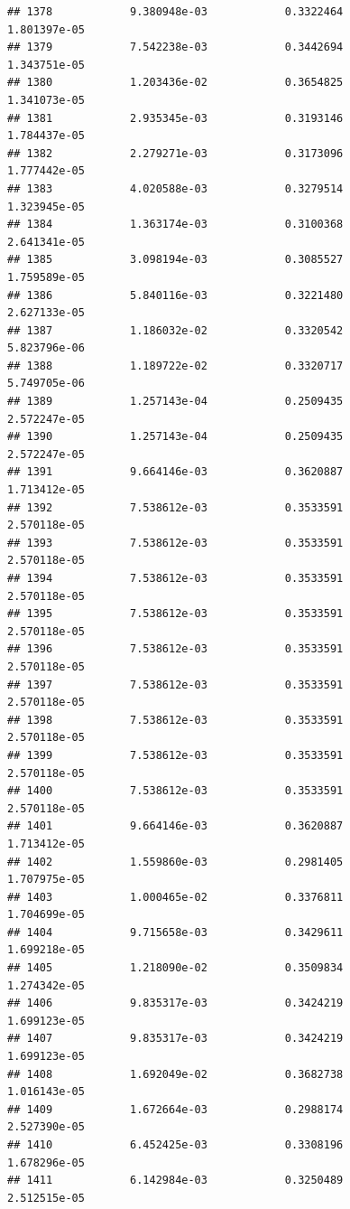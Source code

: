 \documentclass[
]{article}
\begin{document}
\begin{verbatim}
## 1378            9.380948e-03            0.3322464            1.801397e-05
## 1379            7.542238e-03            0.3442694            1.343751e-05
## 1380            1.203436e-02            0.3654825            1.341073e-05
## 1381            2.935345e-03            0.3193146            1.784437e-05
## 1382            2.279271e-03            0.3173096            1.777442e-05
## 1383            4.020588e-03            0.3279514            1.323945e-05
## 1384            1.363174e-03            0.3100368            2.641341e-05
## 1385            3.098194e-03            0.3085527            1.759589e-05
## 1386            5.840116e-03            0.3221480            2.627133e-05
## 1387            1.186032e-02            0.3320542            5.823796e-06
## 1388            1.189722e-02            0.3320717            5.749705e-06
## 1389            1.257143e-04            0.2509435            2.572247e-05
## 1390            1.257143e-04            0.2509435            2.572247e-05
## 1391            9.664146e-03            0.3620887            1.713412e-05
## 1392            7.538612e-03            0.3533591            2.570118e-05
## 1393            7.538612e-03            0.3533591            2.570118e-05
## 1394            7.538612e-03            0.3533591            2.570118e-05
## 1395            7.538612e-03            0.3533591            2.570118e-05
## 1396            7.538612e-03            0.3533591            2.570118e-05
## 1397            7.538612e-03            0.3533591            2.570118e-05
## 1398            7.538612e-03            0.3533591            2.570118e-05
## 1399            7.538612e-03            0.3533591            2.570118e-05
## 1400            7.538612e-03            0.3533591            2.570118e-05
## 1401            9.664146e-03            0.3620887            1.713412e-05
## 1402            1.559860e-03            0.2981405            1.707975e-05
## 1403            1.000465e-02            0.3376811            1.704699e-05
## 1404            9.715658e-03            0.3429611            1.699218e-05
## 1405            1.218090e-02            0.3509834            1.274342e-05
## 1406            9.835317e-03            0.3424219            1.699123e-05
## 1407            9.835317e-03            0.3424219            1.699123e-05
## 1408            1.692049e-02            0.3682738            1.016143e-05
## 1409            1.672664e-03            0.2988174            2.527390e-05
## 1410            6.452425e-03            0.3308196            1.678296e-05
## 1411            6.142984e-03            0.3250489            2.512515e-05

\end{verbatim}
\end{document}
